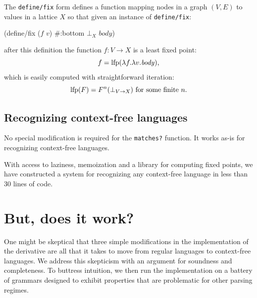 The {\tt define/fix} form defines a function mapping nodes in a graph $(V,E)$
to values in a lattice $X$ so that given an instance of {\tt define/fix}:
\def\botX{{\bot_X}}
\begin{code}
(define/fix (\(f\) \(v\)) #:bottom \(\botX\) \(\mathit{body}\))\end{code}
%
after this definition the function $f : V \to X$ is a least fixed point:
\begin{equation*}
 f = \operatorname{lfp}(\lambda f . \lambda v . \mathit{body})
 \text,
\end{equation*}
which is easily computed with straightforward iteration:
\begin{equation*}
 \operatorname{lfp}(F) = F^n(\bot_{V \to X}) \text{ for some finite } n
 \text.
\end{equation*}


% 



\subsection{Recognizing context-free languages}
%
No special modification is required for the {\tt matches?} function.  
%
It works as-is for recognizing context-free languages.

With access to laziness, memoization and a library for computing fixed points,
we have constructed a system for recognizing any context-free language
in less than 30 lines of code.


\section{But, does it work?}

One might be skeptical that three simple modifications in the implementation of
the derivative are all that it takes to move from regular languages to
context-free languages.
%
We address this skepticism with an argument for soundness and completeness.
%
To buttress intuition, 
we then run the implementation
on a battery of grammars designed to exhibit properties that are problematic
for other parsing regimes.


